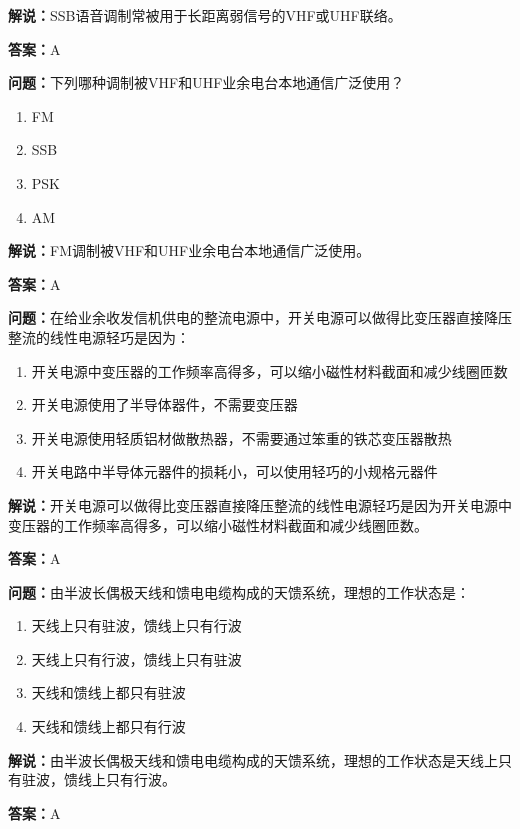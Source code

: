 \textbf{解说：}SSB语音调制常被用于长距离弱信号的VHF或UHF联络。%

\textbf{答案：}A

\textbf{问题：}下列哪种调制被VHF和UHF业余电台本地通信广泛使用？

\begin{enumerate}[label=\Alph*), leftmargin=3em]
	\item FM
	\item SSB
	\item PSK
	\item AM
\end{enumerate}

\textbf{解说：}FM调制被VHF和UHF业余电台本地通信广泛使用。%

\textbf{答案：}A

\textbf{问题：}在给业余收发信机供电的整流电源中，开关电源可以做得比变压器直接降压整流的线性电源轻巧是因为：

\begin{enumerate}[label=\Alph*), leftmargin=3em]
	\item 开关电源中变压器的工作频率高得多，可以缩小磁性材料截面和减少线圈匝数
	\item 开关电源使用了半导体器件，不需要变压器
	\item 开关电源使用轻质铝材做散热器，不需要通过笨重的铁芯变压器散热
	\item 开关电路中半导体元器件的损耗小，可以使用轻巧的小规格元器件
\end{enumerate}

\textbf{解说：}开关电源可以做得比变压器直接降压整流的线性电源轻巧是因为开关电源中变压器的工作频率高得多，可以缩小磁性材料截面和减少线圈匝数。%

\textbf{答案：}A

\textbf{问题：}由半波长偶极天线和馈电电缆构成的天馈系统，理想的工作状态是：

\begin{enumerate}[label=\Alph*), leftmargin=3em]
	\item 天线上只有驻波，馈线上只有行波
	\item 天线上只有行波，馈线上只有驻波
	\item 天线和馈线上都只有驻波
	\item 天线和馈线上都只有行波
\end{enumerate}

\textbf{解说：}由半波长偶极天线和馈电电缆构成的天馈系统，理想的工作状态是天线上只有驻波，馈线上只有行波。%

\textbf{答案：}A

